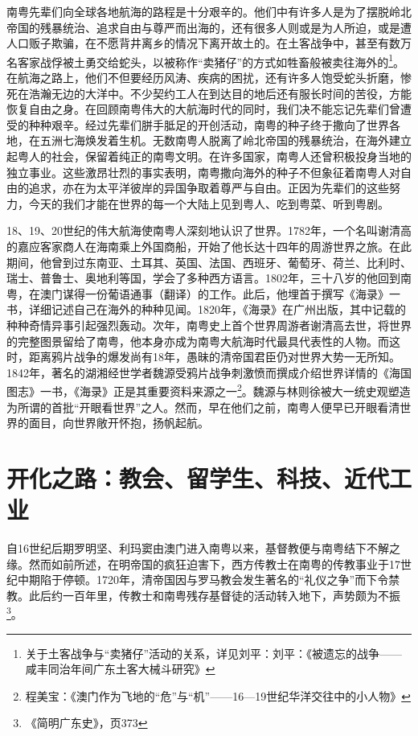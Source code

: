 南粤先辈们向全球各地航海的路程是十分艰辛的。他们中有许多人是为了摆脱岭北帝国的残暴统治、追求自由与尊严而出海的，还有很多人则或是为人所迫，或是遭人口贩子欺骗，在不愿背井离乡的情况下离开故土的。在土客战争中，甚至有数万名客家战俘被土勇交给蛇头，以被称作“卖猪仔”的方式如牲畜般被卖往海外的\footnote{关于土客战争与“卖猪仔”活动的关系，详见刘平：刘平：《被遗忘的战争——咸丰同治年间广东土客大械斗研究》}。在航海之路上，他们不但要经历风涛、疾病的困扰，还有许多人饱受蛇头折磨，惨死在浩瀚无边的大洋中。不少契约工人在到达目的地后还有服长时间的苦役，方能恢复自由之身。在回顾南粤伟大的大航海时代的同时，我们决不能忘记先辈们曾遭受的种种艰辛。经过先辈们胼手胝足的开创活动，南粤的种子终于撒向了世界各地，在五洲七海焕发着生机。无数南粤人脱离了岭北帝国的残暴统治，在海外建立起粤人的社会，保留着纯正的南粤文明。在许多国家，南粤人还曾积极投身当地的独立事业。这些激昂壮烈的事实表明，南粤撒向海外的种子不但象征着南粤人对自由的追求，亦在为太平洋彼岸的异国争取着尊严与自由。正因为先辈们的这些努力，今天的我们才能在世界的每一个大陆上见到粤人、吃到粤菜、听到粤剧。

18、19、20世纪的伟大航海使南粤人深刻地认识了世界。1782年，一个名叫谢清高的嘉应客家商人在海南乘上外国商船，开始了他长达十四年的周游世界之旅。在此期间，他曾到过东南亚、土耳其、英国、法国、西班牙、葡萄牙、荷兰、比利时、瑞士、普鲁士、奥地利等国，学会了多种西方语言。1802年，三十八岁的他回到南粤，在澳门谋得一份葡语通事（翻译）的工作。此后，他埋首于撰写《海录》一书，详细记述自己在海外的种种见闻。1820年，《海录》在广州出版，其中记载的种种奇情异事引起强烈轰动。次年，南粤史上首个世界周游者谢清高去世，将世界的完整图景留给了南粤，他本身亦成为南粤大航海时代最具代表性的人物。而这时，距离鸦片战争的爆发尚有18年，愚昧的清帝国君臣仍对世界大势一无所知。1842年，著名的湖湘经世学者魏源受鸦片战争刺激愤而撰成介绍世界详情的《海国图志》一书，《海录》正是其重要资料来源之一\footnote{程美宝：《澳门作为飞地的“危”与“机”——16—19世纪华洋交往中的小人物》}。魏源与林则徐被大一统史观塑造为所谓的首批“开眼看世界”之人。然而，早在他们之前，南粤人便早已开眼看清世界的面目，向世界敞开怀抱，扬帆起航。

\section{开化之路：教会、留学生、科技、近代工业}

自16世纪后期罗明坚、利玛窦由澳门进入南粤以来，基督教便与南粤结下不解之缘。然而如前所述，在明帝国的疯狂迫害下，西方传教士在南粤的传教事业于17世纪中期陷于停顿。1720年，清帝国因与罗马教会发生著名的“礼仪之争”而下令禁教。此后约一百年里，传教士和南粤残存基督徒的活动转入地下，声势颇为不振\footnote{《简明广东史》，页373}。

